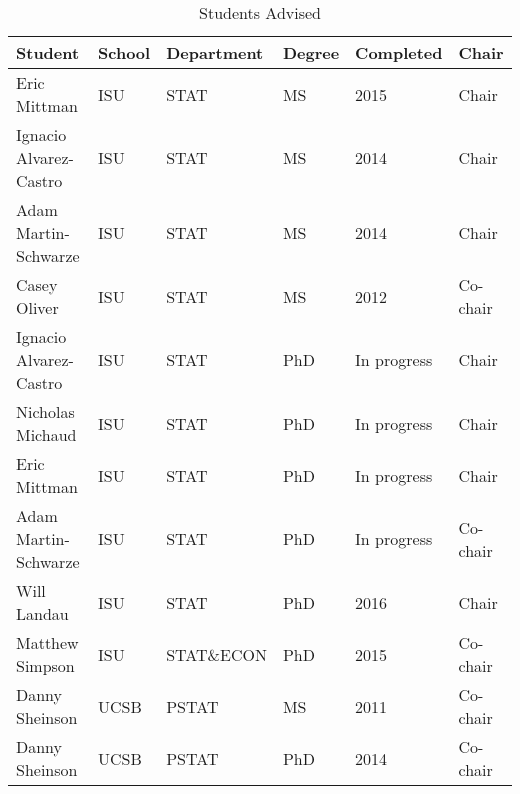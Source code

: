 \begin{table}[h]
\centering
\caption{Students Advised} 
\label{tab:advisees}
\begin{tabular}{llllll}
  \hline
Student & School & Department & Degree & Completed & Chair \\ 
  \hline
Eric Mittman & ISU & STAT & MS & 2015 & Chair \\ 
  Ignacio Alvarez-Castro & ISU & STAT & MS & 2014 & Chair \\ 
  Adam Martin-Schwarze & ISU & STAT & MS & 2014 & Chair \\ 
  Casey Oliver & ISU & STAT & MS & 2012 & Co-chair \\ 
  Ignacio Alvarez-Castro & ISU & STAT & PhD & In progress & Chair \\ 
  Nicholas Michaud & ISU & STAT & PhD & In progress & Chair \\ 
  Eric Mittman & ISU & STAT & PhD & In progress & Chair \\ 
  Adam Martin-Schwarze & ISU & STAT & PhD & In progress & Co-chair \\ 
  Will Landau & ISU & STAT & PhD & 2016 & Chair \\ 
  Matthew Simpson & ISU & STAT\&ECON & PhD & 2015 & Co-chair \\ 
  Danny Sheinson & UCSB & PSTAT & MS & 2011 & Co-chair \\ 
  Danny Sheinson & UCSB & PSTAT & PhD & 2014 & Co-chair \\ 
   \hline
\end{tabular}
\end{table}
